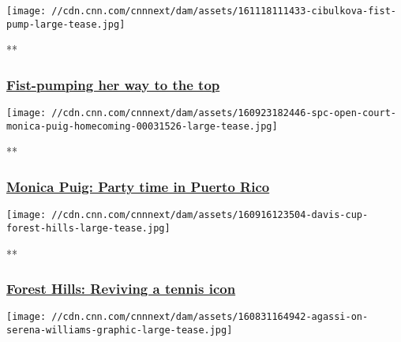 \href{/videos/sports/2016/11/18/spc-open-court-cibulkova-singapore-win.cnn}{}

\texttt{[image: //cdn.cnn.com/cnnnext/dam/assets/161118111433-cibulkova-fist-pump-large-tease.jpg]}

**

\hypertarget{fist-pumping-her-way-to-the-top}{%
\subsubsection{\texorpdfstring{\href{/videos/sports/2016/11/18/spc-open-court-cibulkova-singapore-win.cnn}{Fist-pumping
her way to the
top}}{Fist-pumping her way to the top}}\label{fist-pumping-her-way-to-the-top}}

\href{/videos/sports/2016/09/23/spc-open-court-monica-puig-homecoming.cnn}{}

\texttt{[image: //cdn.cnn.com/cnnnext/dam/assets/160923182446-spc-open-court-monica-puig-homecoming-00031526-large-tease.jpg]}

**

\hypertarget{monica-puig-party-time-in-puerto-rico}{%
\subsubsection{\texorpdfstring{\href{/videos/sports/2016/09/23/spc-open-court-monica-puig-homecoming.cnn}{Monica
Puig: Party time in Puerto
Rico}}{Monica Puig: Party time in Puerto Rico}}\label{monica-puig-party-time-in-puerto-rico}}

\href{/videos/sports/2016/09/23/spc-open-court-us-open-forest-hills.cnn}{}

\texttt{[image: //cdn.cnn.com/cnnnext/dam/assets/160916123504-davis-cup-forest-hills-large-tease.jpg]}

**

\hypertarget{forest-hills-reviving-a-tennis-icon}{%
\subsubsection{\texorpdfstring{\href{/videos/sports/2016/09/23/spc-open-court-us-open-forest-hills.cnn}{Forest
Hills: Reviving a tennis
icon}}{Forest Hills: Reviving a tennis icon}}\label{forest-hills-reviving-a-tennis-icon}}

\href{/videos/tv/2016/08/31/tennis-agassi-djokovic-serena.cnn}{}

\texttt{[image: //cdn.cnn.com/cnnnext/dam/assets/160831164942-agassi-on-serena-williams-graphic-large-tease.jpg]}

